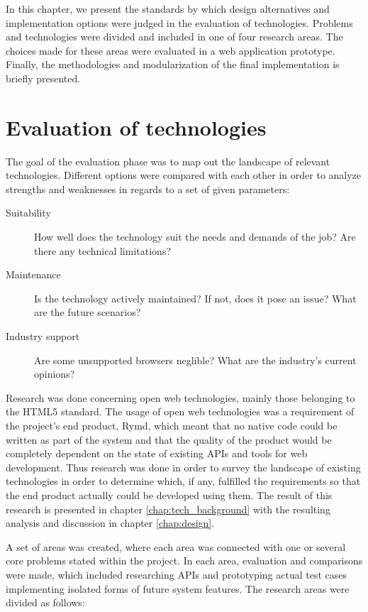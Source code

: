 In this chapter, we present the standards by which design alternatives and implementation options were judged in the evaluation of technologies. Problems and technologies were divided and included in one of four research areas. The choices made for these areas were evaluated in a web application prototype. Finally, the methodologies and modularization of the final implementation is briefly presented.

\section{Evaluation of technologies}

The goal of the evaluation phase was to map out the landscape of relevant technologies. Different options were compared with each other in order to analyze strengths and weaknesses in regards to a set of given parameters:

\begin{description}
  \item[Suitability] How well does the technology suit the needs and demands of the job? Are there any technical limitations?
  \item[Maintenance] Is the technology actively maintained? If not, does it pose an issue? What are the future scenarios?
  \item[Industry support] Are some unsupported browsers neglible? What are the industry's current opinions?
\end{description}

Research was done concerning open web technologies, mainly those belonging to the HTML5 standard. The usage of open web technologies was a requirement of the project's end product, Rymd, which meant that no native code could be written as part of the system and that the quality of the product would be completely dependent on the state of existing APIs and tools for web development. Thus research was done in order to survey the landscape of existing technologies in order to determine which, if any, fulfilled the requirements so that the end product actually could be developed using them. The result of this research is presented in chapter \ref{chap:tech_background} with the resulting analysis and discussion in chapter \ref{chap:design}.

A set of areas was created, where each area was connected with one or several core problems stated within the project. In each area, evaluation and comparisons were made, which included researching APIs and prototyping actual test cases implementing isolated forms of future system features. The research areas were divided as follows:

